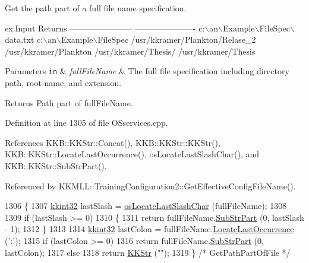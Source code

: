 Get the path part of a full file name specification. 


\begin{DoxyCode}
ex:Input                              Returns
   -----------------------            ----------------------
   c:\(\backslash\)an\(\backslash\)Example\(\backslash\)FileSpec\(\backslash\)data.txt    c:\(\backslash\)an\(\backslash\)Example\(\backslash\)FileSpec
   /usr/kkramer/Plankton/Relase\_2     /usr/kkramer/Plankton
   /usr/kkramer/Thesis/               /usr/kkramer/Thesis
\end{DoxyCode}
 
\begin{DoxyParams}[1]{Parameters}
\mbox{\tt in}  & {\em full\+File\+Name} & The full file specification including directory path, root-\/name, and extension. \\
\hline
\end{DoxyParams}
\begin{DoxyReturn}{Returns}
Path part of full\+File\+Name. 
\end{DoxyReturn}


Definition at line 1305 of file O\+Sservices.\+cpp.



References K\+K\+B\+::\+K\+K\+Str\+::\+Concat(), K\+K\+B\+::\+K\+K\+Str\+::\+K\+K\+Str(), K\+K\+B\+::\+K\+K\+Str\+::\+Locate\+Last\+Occurrence(), os\+Locate\+Last\+Slash\+Char(), and K\+K\+B\+::\+K\+K\+Str\+::\+Sub\+Str\+Part().



Referenced by K\+K\+M\+L\+L\+::\+Training\+Configuration2\+::\+Get\+Effective\+Config\+File\+Name().


\begin{DoxyCode}
1306 \{
1307   \hyperlink{namespace_k_k_b_a8fa4952cc84fda1de4bec1fbdd8d5b1b}{kkint32}  lastSlash =  \hyperlink{namespace_k_k_b_ada3fe25ed5e0c30732f3cd6bd2a29edb}{osLocateLastSlashChar} (fullFileName);
1308 
1309   \textcolor{keywordflow}{if}  (lastSlash >= 0)
1310   \{
1311     \textcolor{keywordflow}{return}  fullFileName.\hyperlink{class_k_k_b_1_1_k_k_str_a5f20b2ddfc9f07c8ef99592810332ddb}{SubStrPart} (0, lastSlash - 1);
1312   \}
1313 
1314   \hyperlink{namespace_k_k_b_a8fa4952cc84fda1de4bec1fbdd8d5b1b}{kkint32}  lastColon = fullFileName.\hyperlink{class_k_k_b_1_1_k_k_str_a595b364acd17c015b5f66d9f7996bfab}{LocateLastOccurrence} (\textcolor{charliteral}{':'});
1315   \textcolor{keywordflow}{if}  (lastColon >= 0)
1316     \textcolor{keywordflow}{return}  fullFileName.\hyperlink{class_k_k_b_1_1_k_k_str_a5f20b2ddfc9f07c8ef99592810332ddb}{SubStrPart} (0, lastColon);
1317   \textcolor{keywordflow}{else}
1318     \textcolor{keywordflow}{return}  \hyperlink{class_k_k_b_1_1_k_k_str}{KKStr} (\textcolor{stringliteral}{""});
1319 \}  \textcolor{comment}{/* GetPathPartOfFile */}
\end{DoxyCode}
